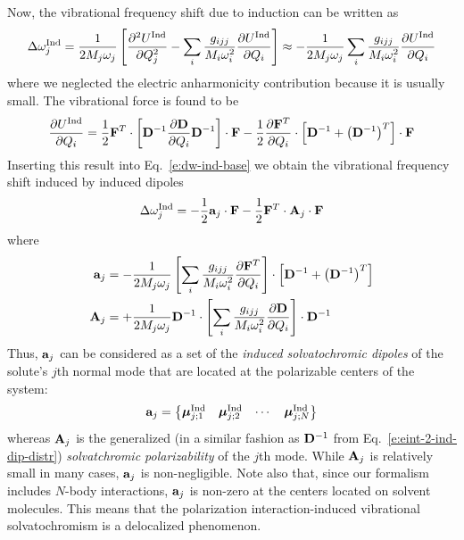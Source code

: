 \documentclass[a4paper,titlepage,twoside,fleqn,12pt]{book}
\newcommand{\BM}[1]{\ensuremath{\mbox{\boldmath${#1}$}}}
\newcommand{\fderiv}[2]{\ensuremath{
\frac{\partial #1}{\partial #2}}}
\newcommand{\sderiv}[2]{\ensuremath{
\frac{\partial^2 #1}{\partial #2^2}
}}
\begin{document}
\begin{refsection}
Now, the vibrational frequency shift due to induction can be written
as
%
\begin{equation}\label{e:dw-ind-base}
\Delta \omega_j^{\rm Ind} =
\frac{1}{2M_j\omega_j} \left[ 
\sderiv{U^{\rm Ind}}{Q_j} -
\sum_i \frac{g_{ijj}}{M_i\omega_i^2}\fderiv{U^{\rm Ind}}{Q_i}
\right]
\approx 
-\frac{1}{2M_j\omega_j}\sum_i \frac{g_{ijj}}{M_i\omega_i^2}\fderiv{U^{\rm Ind}}{Q_i}
\end{equation}
%
where we neglected the electric anharmonicity contribution because it is usually small.
The vibrational force is found to be
%
\begin{equation} \label{e:vibr-force-ind}
\fderiv{U^{\rm Ind}}{Q_i} = \frac{1}{2} {\bf F}^{T} \cdot
     \left[ 
           {\bf D}^{-1} \fderiv{{\bf D}}{Q_i} {\bf D}^{-1}
     \right] \cdot {\bf F}
     - \frac{1}{2} \fderiv{{\bf F}^{T}}{Q_i} \cdot
     \left[
            {\bf D}^{-1} + \left({\bf D}^{-1} \right)^T
     \right] \cdot {\bf F}
\end{equation}
%
Inserting this result into Eq.~\eqref{e:dw-ind-base}
we obtain the vibrational frequency shift induced by induced dipoles
%
\begin{equation}\label{e:dw-ind-avec}
\Delta\omega_j^{\rm Ind} = - \frac{1}{2}                 {\bf a}_j \cdot {\bf F} 
                           - \frac{1}{2} {\bf F}^T \cdot {\bf A}_j \cdot {\bf F}
\end{equation}
%
where
%
\begin{subequations} \label{e:a-A}
 \begin{align}
 {\bf a}_j &= -\frac{1}{2M_j\omega_j} \left[ \sum_i \frac{g_{ijj}}{M_i\omega_i^2} 
               \fderiv{{\bf F}^T}{Q_i} \right] \cdot \left[ {\bf D}^{-1} + \left({\bf D}^{-1}\right)^T\right]\\
%
 {\bf A}_j &= +\frac{1}{2M_j\omega_j} {\bf D}^{-1} \cdot 
               \left[ \sum_i \frac{g_{ijj}}{M_i\omega_i^2} \fderiv{{\bf D}}{Q_i} \right] 
               \cdot {\bf D}^{-1}
 \end{align}
\end{subequations}
%
Thus, ${\bf a}_j$ can be considered as a set of the \emph{induced
solvatochromic dipoles} of the solute's $j$th normal mode that are 
located at the polarizable centers of the system:
%
\begin{equation} \label{e:a-vec}
 {\bf a}_j =
 \begin{Bmatrix}
  {\BM \mu}_{j;1}^{\rm Ind} & {\BM \mu}_{j;2}^{\rm Ind} & \cdots & {\BM \mu}_{j;N}^{\rm Ind}
 \end{Bmatrix}
\end{equation}
%
whereas ${\bf A}_j$ is the generalized (in a similar fashion as ${\bf D}^{-1}$ 
from Eq.~\eqref{e:eint-2-ind-dip-distr}) \emph{solvatchromic polarizability} of the $j$th mode.
While ${\bf A}_j$ is relatively small in many cases, ${\bf a}_j$ is non\hyp{}negligible.
Note also that, since our formalism includes $N$\hyp{}body interactions,
${\bf a}_j$ is non\hyp{}zero at the centers located on solvent molecules.
This means that the polarization interaction\hyp{}induced vibrational solvatochromism
is a delocalized phenomenon.


\end{refsection}
\end{document}
